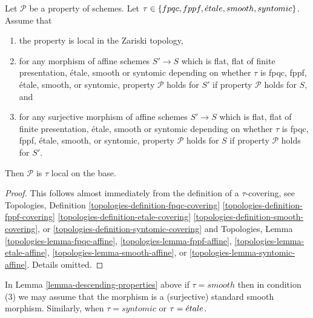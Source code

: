 \begin{lemma}
\label{lemma-descending-properties}
Let $\mathcal{P}$ be a property of schemes.
Let $\tau \in \{fpqc, \linebreak[0] fppf, \linebreak[0]
\etale, \linebreak[0] smooth, \linebreak[0] syntomic\}$.
Assume that
\begin{enumerate}
\item the property is local in the Zariski topology,
\item for any morphism of affine schemes $S' \to S$
which is flat, flat of finite presentation,
\'etale, smooth or syntomic depending on whether $\tau$ is
fpqc, fppf, \'etale, smooth, or syntomic,
property $\mathcal{P}$ holds for $S'$ if property $\mathcal{P}$
holds for $S$, and
\item for any surjective morphism of affine schemes $S' \to S$
which is flat, flat of finite presentation,
\'etale, smooth or syntomic depending on whether $\tau$ is
fpqc, fppf, \'etale, smooth, or syntomic,
property $\mathcal{P}$ holds for $S$ if property $\mathcal{P}$
holds for $S'$.
\end{enumerate}
Then $\mathcal{P}$ is $\tau$ local on the base.
\end{lemma}

\begin{proof}
This follows almost immediately from the definition of
a $\tau$-covering, see
Topologies, Definition
\ref{topologies-definition-fpqc-covering}
\ref{topologies-definition-fppf-covering}
\ref{topologies-definition-etale-covering}
\ref{topologies-definition-smooth-covering}, or
\ref{topologies-definition-syntomic-covering}
and Topologies, Lemma
\ref{topologies-lemma-fpqc-affine},
\ref{topologies-lemma-fppf-affine},
\ref{topologies-lemma-etale-affine},
\ref{topologies-lemma-smooth-affine}, or
\ref{topologies-lemma-syntomic-affine}.
Details omitted.
\end{proof}

\begin{remark}
\label{remark-descending-properties-standard}
In Lemma \ref{lemma-descending-properties} above if
$\tau = smooth$ then in condition (3) we may assume that
the morphism is a (surjective) standard smooth morphism.
Similarly, when $\tau = syntomic$ or $\tau = {\acute{e}tale}$.
\end{remark}





